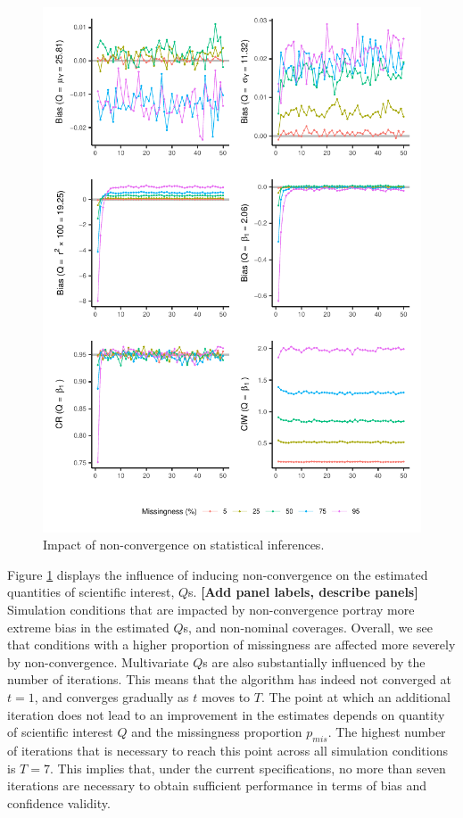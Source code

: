 \documentclass[Royal,times,sageh]{sagej}
\begin{document}
\begin{figure}

{\centering \includegraphics{2.Manuscript_files/figure-latex/Qs-1} 

}

\caption{Impact of non-convergence on statistical inferences.}\label{fig:Qs}
\end{figure}

Figure \ref{fig:Qs} displays the influence of inducing non-convergence on the estimated quantities of scientific interest, \(Q\)s. \textbf{{[}Add panel labels, describe panels{]}} Simulation conditions that are impacted by non-convergence portray more extreme bias in the estimated \(Q\)s, and non-nominal coverages. Overall, we see that conditions with a higher proportion of missingness are affected more severely by non-convergence. Multivariate \(Q\)s are also substantially influenced by the number of iterations. This means that the algorithm has indeed not converged at \(t=1\), and converges gradually as \(t\) moves to \(T\). The point at which an additional iteration does not lead to an improvement in the estimates depends on quantity of scientific interest \(Q\) and the missingness proportion \(p_{mis}\). The highest number of iterations that is necessary to reach this point across all simulation conditions is \(T=7\). This implies that, under the current specifications, no more than seven iterations are necessary to obtain sufficient performance in terms of bias and confidence validity.
\end{document}
